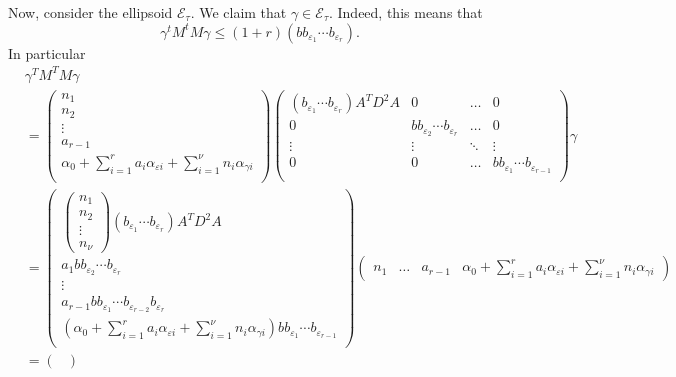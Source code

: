 Now, consider the ellipsoid $\mathcal{E}_\tau$. We claim that $\gamma \in \mathcal{E}_{\tau}$. Indeed, this means that 
\[\gamma^tM^tM\gamma  \leq (1 + r)(bb_{\varepsilon_1}\cdots b_{\varepsilon_r}).\]
In particular
\begin{align*}
& \gamma^TM^TM\gamma \\ 
	& = \begin{pmatrix}
	n_1 \\ n_2 \\ \vdots \\ a_{r - 1} \\ \alpha_0+\sum_{i = 1}^r a_i \alpha_{\varepsilon i} + \sum_{i = 1}^{\nu} n_i 	\alpha_{\gamma i}\\ 
	\end{pmatrix}
	\begin{pmatrix}
	(b_{\varepsilon_1}\cdots b_{\varepsilon_r})A^TD^2A & 0 & \dots & 0\\
	0 & b b_{\varepsilon_2}\cdots b_{\varepsilon_r} & \dots & 0 \\
	\vdots & \vdots  &  \ddots & \vdots\\ 
	0 & 0 & \dots & bb_{\varepsilon_1}\cdots b_{\varepsilon_{r-1}} \\
	\end{pmatrix}
	\gamma\\
	& = \begin{pmatrix}
		\begin{pmatrix} 
		n_1 \\ n_2 \\ \vdots \\ n_{\nu}
		\end{pmatrix}(b_{\varepsilon_1}\cdots b_{\varepsilon_r})A^TD^2A\\
		a_1 b b_{\varepsilon_2}\cdots b_{\varepsilon_r} \\ 
		\vdots \\
		a_{r - 1} b b_{\varepsilon_1}\cdots b_{\varepsilon_{r-2}}b_{\varepsilon_r} \\ 
		\left(\alpha_0+\sum_{i = 1}^r a_i \alpha_{\varepsilon i} + \sum_{i = 1}^{\nu} n_i \alpha_{\gamma i}\right)b b_{\varepsilon_1}\cdots b_{\varepsilon_{r-1}}\\ 
	\end{pmatrix}
	\begin{pmatrix}
	 n_1 & \dots & a_{r-1} & \alpha_0+\sum_{i = 1}^r a_i \alpha_{\varepsilon i} + \sum_{i = 1}^{\nu} n_i \alpha_{\gamma i}
	 \end{pmatrix}\\
	 & = \begin{pmatrix} 

\end{pmatrix}
\end{align*}

